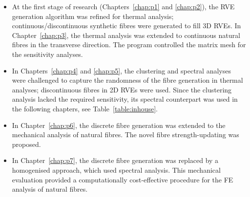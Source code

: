 	\begin{itemize}
		\item At the first stage of research (Chapters~\ref{chap:p1} and \ref{chap:p2}), the RVE generation algorithm was refined for thermal analysis; continuous/discontinuous synthetic fibres were generated to fill 3D RVEs. In Chapter~\ref{chap:p3}, the thermal analysis was extended to continuous natural fibres in the transverse direction. The program controlled the matrix mesh for the sensitivity analyses.
		\item In Chapters~\ref{chap:p4} and \ref{chap:p5}, the clustering and spectral analyses were challenged to capture the randomness of the fibre generation in thermal analyses; discontinuous fibres in 2D RVEs were used. Since the clustering analysis lacked the required sensitivity, its spectral counterpart was used in the following chapters, see Table~\ref{table:inhouse}.		 
		\item In Chapter~\ref{chap:p6}, the discrete fibre generation was extended to the mechanical analysis of natural fibres. The novel fibre strength-updating was proposed.
		\item In Chapter~\ref{chap:p7}, the discrete fibre generation was replaced by a homogenised approach, which used spectral analysis. This mechanical evaluation provided a computationally cost-effective procedure for the FE analysis of natural fibres.
	\end{itemize}
	
